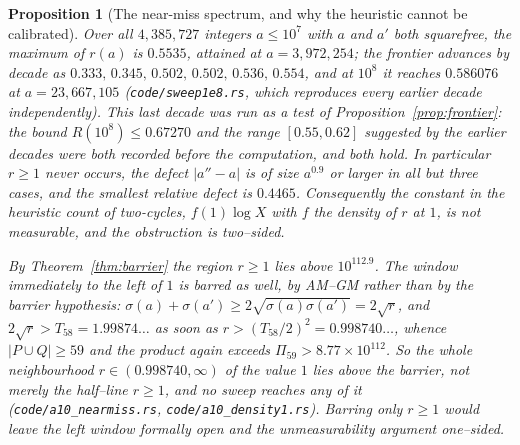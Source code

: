 \documentclass[11pt]{article}
\newtheorem{proposition}[theorem]{Proposition}
\theoremstyle{definition}
\begin{document}
\begin{proposition}[The near-miss spectrum, and why the heuristic cannot be calibrated]\label{prop:nearmiss}
Over all $4{,}385{,}727$ integers $a\le10^7$ with $a$ and $a'$ both squarefree, the maximum of
$r(a)$ is $0.5535$, attained at $a=3{,}972{,}254$; the frontier advances by decade as
$0.333,\,0.345,\,0.502,\,0.502,\,0.536,\,0.554$, and at $10^{8}$ it reaches $0.586076$ at
$a=23{,}667{,}105$ \textup{(\texttt{code/sweep1e8.rs}, which reproduces every earlier decade
independently)}. This last decade was run as a test of Proposition~\ref{prop:frontier}: the bound
$R(10^{8})\le0.67270$ and the range $[0.55,0.62]$ suggested by the earlier decades were both
recorded before the computation, and both hold. In particular $r\ge1$ never occurs, the defect
$|a''-a|$ is of size $a^{0.9}$ or larger in all but three cases, and the smallest relative defect is
$0.4465$. Consequently the constant in the heuristic count of two-cycles, $f(1)\log X$ with $f$ the
density of $r$ at $1$, is \emph{not measurable}, and the obstruction is two--sided.

By Theorem~\textup{\ref{thm:barrier}} the region $r\ge1$ lies above $10^{112.9}$. The window
immediately to the \emph{left} of $1$ is barred as well, by AM--GM rather than by the barrier
hypothesis: $\sigma(a)+\sigma(a')\ge2\sqrt{\sigma(a)\sigma(a')}=2\sqrt r$, and
$2\sqrt r>T_{58}=1.99874\ldots$ as soon as $r>(T_{58}/2)^2=0.998740\ldots$, whence $|P\cup Q|\ge59$
and the product again exceeds $\Pi_{59}>8.77\times10^{112}$. So the whole neighbourhood
$r\in(0.998740,\infty)$ of the value $1$ lies above the barrier, not merely the half--line $r\ge1$,
and no sweep reaches any of it \textup{(\texttt{code/a10\_nearmiss.rs},
\texttt{code/a10\_density1.rs})}. Barring only $r\ge1$ would leave the left window formally open and the unmeasurability argument one--sided.
\end{proposition}
\end{document}
